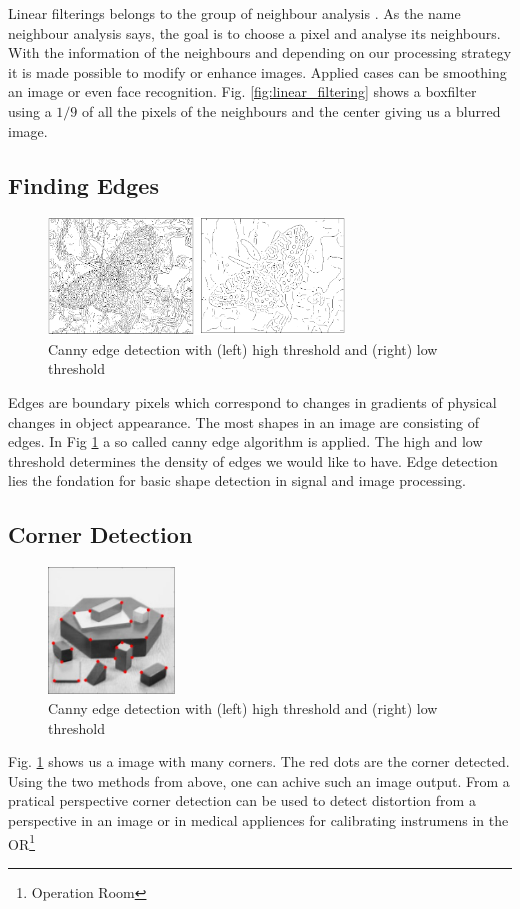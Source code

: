 \documentclass[12pt]{article}
\begin{document}
Linear filterings belongs to the group of neighbour analysis \cite{comp_intro}. As the 
name neighbour analysis says, the goal is to choose a pixel and analyse its neighbours.
With the information of the neighbours and depending on our processing strategy it is 
made possible to modify or enhance images. Applied cases can be smoothing an image or even
face recognition. Fig. \ref{fig:linear_filtering} shows a boxfilter using a $1/9$ of all
the pixels of the neighbours and the center giving us a blurred image.

\subsection{Finding Edges}
\begin{figure}[!htb]
  \centering
  \includegraphics[width=0.7\textwidth]{pics/canny}
  \caption{Canny edge detection with (left) high threshold and (right) low threshold}
\end{figure}
Edges are boundary pixels which correspond to changes in gradients of physical changes
in object appearance. The most shapes in an image are consisting of edges. In Fig \ref{fig:canny}
a so called canny edge algorithm is applied. The high and low threshold determines the density of
edges we would like to have. Edge detection lies the fondation for basic shape detection in 
signal and image processing.

\subsection{Corner Detection}
\begin{figure}[!htb]
  \centering
  \includegraphics[width=0.3\textwidth]{pics/corner_detection}
  \caption{Canny edge detection with (left) high threshold and (right) low threshold}
  \label{fig:canny}
\end{figure}
Fig. \ref{fig:canny} shows us a image with many corners. The red dots are the corner detected.
Using the two methods from above, one can achive such an image output. From a pratical perspective
corner detection can be used to detect distortion from a perspective in an image or in medical
appliences for calibrating instrumens in the OR\footnote{Operation Room}
\pagebreak
\end{document}
